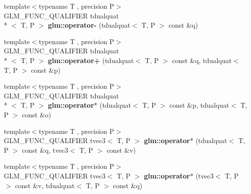 \begin{DoxyCompactItemize}
\item 
\hypertarget{group__gtx__dual__quaternion_ga90a25279ac4f392a823e8bf6dfaddb9b}{{\footnotesize template$<$typename T , precision P$>$ }\\G\-L\-M\-\_\-\-F\-U\-N\-C\-\_\-\-Q\-U\-A\-L\-I\-F\-I\-E\-R tdualquat\\*
$<$ T, P $>$ {\bfseries glm\-::operator-\/} (tdualquat$<$ T, P $>$ const \&q)}\label{group__gtx__dual__quaternion_ga90a25279ac4f392a823e8bf6dfaddb9b}

\item 
\hypertarget{group__gtx__dual__quaternion_ga9d7cfca38c6ff90757705600da3c7972}{{\footnotesize template$<$typename T , precision P$>$ }\\G\-L\-M\-\_\-\-F\-U\-N\-C\-\_\-\-Q\-U\-A\-L\-I\-F\-I\-E\-R tdualquat\\*
$<$ T, P $>$ {\bfseries glm\-::operator+} (tdualquat$<$ T, P $>$ const \&q, tdualquat$<$ T, P $>$ const \&p)}\label{group__gtx__dual__quaternion_ga9d7cfca38c6ff90757705600da3c7972}

\item 
\hypertarget{group__gtx__dual__quaternion_ga2c224f87242fe82e8ebc17f01aa51126}{{\footnotesize template$<$typename T , precision P$>$ }\\G\-L\-M\-\_\-\-F\-U\-N\-C\-\_\-\-Q\-U\-A\-L\-I\-F\-I\-E\-R tdualquat\\*
$<$ T, P $>$ {\bfseries glm\-::operator$\ast$} (tdualquat$<$ T, P $>$ const \&p, tdualquat$<$ T, P $>$ const \&o)}\label{group__gtx__dual__quaternion_ga2c224f87242fe82e8ebc17f01aa51126}

\item 
\hypertarget{namespaceglm_af87c18c3c73e45b62f6d895c323f4a5f}{{\footnotesize template$<$typename T , precision P$>$ }\\G\-L\-M\-\_\-\-F\-U\-N\-C\-\_\-\-Q\-U\-A\-L\-I\-F\-I\-E\-R tvec3$<$ T, P $>$ {\bfseries glm\-::operator$\ast$} (tdualquat$<$ T, P $>$ const \&q, tvec3$<$ T, P $>$ const \&v)}\label{namespaceglm_af87c18c3c73e45b62f6d895c323f4a5f}

\item 
\hypertarget{namespaceglm_ad837ea15bead96f4ecb1335c61c05697}{{\footnotesize template$<$typename T , precision P$>$ }\\G\-L\-M\-\_\-\-F\-U\-N\-C\-\_\-\-Q\-U\-A\-L\-I\-F\-I\-E\-R tvec3$<$ T, P $>$ {\bfseries glm\-::operator$\ast$} (tvec3$<$ T, P $>$ const \&v, tdualquat$<$ T, P $>$ const \&q)}\label{namespaceglm_ad837ea15bead96f4ecb1335c61c05697}


\end{DoxyCompactItemize}
